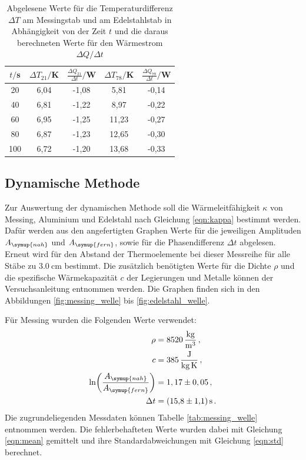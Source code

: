 \begin{table}
  \centering
  \caption{Abgelesene Werte für die Temperaturdifferenz $\Delta T$ am Messingstab und am Edelstahlstab
  in Abhängigkeit von der Zeit $t$ und die daraus berechneten Werte für den Wärmestrom
  $\Delta Q/\Delta t$}
  \label{tab:waermestrom}
  \begin{tabular}{c c c c c}
    \toprule
    $t/$s & $\Delta T_{21}/$K & $\frac{\Delta Q_{21}}{\Delta t}/$W & $\Delta T_{78}/$K & $\frac{\Delta Q_{78}}{\Delta t}/$W \\
    \midrule
    20  & 6,04  & -1,08 & 5,81  & -0,14 \\
    40  & 6,81  & -1,22 & 8,97  & -0,22 \\
    60  & 6,95  & -1,25 & 11,23 & -0,27 \\
    80  & 6,87  & -1,23 & 12,65 & -0,30 \\
    100 & 6,72  & -1,20 & 13,68 & -0,33 \\
    \bottomrule
  \end{tabular}
\end{table}


\subsection{Dynamische Methode}
\label{sec:auswertung_dynamisch}

Zur Auswertung der dynamischen Methode soll die Wärmeleitfähigkeit $\kappa$ von
Messing, Aluminium und Edelstahl nach Gleichung \eqref{eqn:kappa} bestimmt werden.
Dafür werden aus den angefertigten Graphen Werte für die jeweiligen Amplituden
$A_{\symup{nah}}$ und $A_{\symup{fern}}$, sowie für die Phasendifferenz $\Delta t$ abgelesen. Erneut wird für den Abstand der
Thermoelemente bei dieser Messreihe für alle Stäbe zu $\SI{3.0}{\centi\meter}$ bestimmt.
Die zusätzlich benötigten Werte für die Dichte $\rho$ und die spezifische Wärmekapazität $c$
der Legierungen und Metalle können der Versuchsanleitung entnommen werden. Die Graphen
finden sich in den Abbildungen \ref{fig:messing_welle} bis \ref{fig:edelstahl_welle}.

Für Messing wurden die Folgenden Werte verwendet:
\begin{align}
  \rho &= \SI{8520}{\kilo\gram\per\cubic\meter}\,, \nonumber\\
  c &= \SI{385}{\joule\per\kilo\gram\per\kelvin}\,, \nonumber\\
  \ln\biggl(\frac{A_{\symup{nah}}}{A_{\symup{fern}}}\biggr) &= 1,17 \pm 0,05 \,, \nonumber\\
  \Delta t &= \SI{15.8(11)}{\second} \,. \nonumber
\end{align}
Die zugrundeliegenden Messdaten können Tabelle \ref{tab:messing_welle} entnommen
werden. Die fehlerbehafteten Werte wurden dabei mit Gleichung \eqref{eqn:mean} gemittelt
und ihre Standardabweichungen mit Gleichung \eqref{eqn:std} berechnet.

